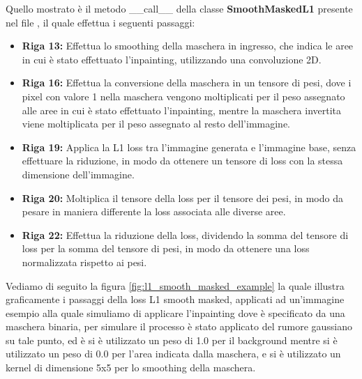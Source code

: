 Quello mostrato è il metodo \_\_call\_\_ della classe \textbf{SmoothMaskedL1} presente nel file ,
il quale effettua i seguenti passaggi:

\begin{itemize}
    \item \textbf{Riga 13:} Effettua lo smoothing della maschera in ingresso, che indica le aree in cui è stato effettuato l'inpainting, utilizzando una convoluzione 2D.
    \item \textbf{Riga 16:} Effettua la conversione della maschera in un tensore di pesi, dove i pixel con valore 1 nella maschera vengono moltiplicati per il peso
        assegnato alle aree in cui è stato effettuato l'inpainting, mentre la maschera invertita viene moltiplicata per il peso assegnato al resto dell'immagine.
    \item \textbf{Riga 19:} Applica la L1 loss tra l'immagine generata e l'immagine base, senza effettuare la riduzione, in modo da ottenere un tensore di loss
        con la stessa dimensione dell'immagine.
    \item \textbf{Riga 20:} Moltiplica il tensore della loss per il tensore dei pesi, in modo da pesare in maniera differente la loss associata alle diverse aree.
    \item \textbf{Riga 22:} Effettua la riduzione della loss, dividendo la somma del tensore di loss per la somma del tensore di pesi,
        in modo da ottenere una loss normalizzata rispetto ai pesi.
\end{itemize}

Vediamo di seguito la figura \ref{fig:l1_smooth_masked_example} la quale illustra graficamente i passaggi della loss L1 smooth masked, applicati ad un'immagine 
esempio alla quale simuliamo di applicare l'inpainting dove è specificato da una maschera binaria, per simulare il processo è stato applicato del rumore gaussiano
su tale punto, ed è si è utilizzato un peso di 1.0 per il background mentre si è utilizzato un peso di 0.0 per l'area indicata dalla maschera, e si è utilizzato un
kernel di dimensione 5x5 per lo smoothing della maschera.

